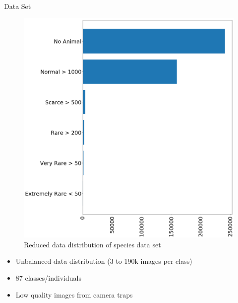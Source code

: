 \documentclass[10pt]{beamer}
\begin{document}
\begin{frame}{Data Set}
	\begin{minipage}[c]{0.48\linewidth}
		\centering
		\begin{figure}
			\includegraphics[width=\linewidth,height=.8\textheight,keepaspectratio]{images/Data_dist_sorted_reduced_v2.png}
			\caption{Reduced data distribution of species data set}
		\end{figure}
	\end{minipage}
	\hfill
	\begin{minipage}[c]{0.48\linewidth}
	\begin{itemize}
		\item Unbalanced data distribution (3 to 190k images per class)
		\item 87 classes/individuals
		\item Low quality images from camera traps
	\end{itemize}

	\end{minipage}
\end{frame}

\end{document}
